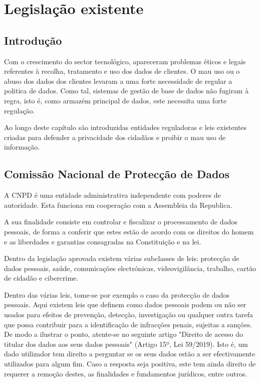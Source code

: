 \chapter{Legislação existente}
\label{chap4:legislacao}

\section{Introdução}
\label{chap4:intro}

Com o crescimento do sector tecnológico, apareceram problemas éticos e legais referentes à recolha, tratamento e uso dos dados de clientes. O mau uso ou o abuso dos dados dos clientes levaram a uma forte necessidade de regular a politica de dados. Como tal, sistemas de gestão de base de dados não fugiram à regra, isto é, como armazém principal de dados, este necessita uma forte regulação.

Ao longo deste capítulo são introduzidas entidades reguladoras e leis existentes criadas para defender a privacidade dos cidadãos e proibir o mau uso de informação.

\section{Comissão Nacional de Protecção de Dados}
\label{chap4:CNPD}

A \ac{CNPD} é uma entidade administrativa independente com poderes de autoridade. Esta funciona em cooperação com a Assembleia da Republica.

A sua finalidade consiste em controlar e fiscalizar o processamento de dados pessoais, de forma a conferir que estes estão de acordo com os direitos do homem e as liberdades e garantias consagradas na Constituição e na lei.

Dentro da legislação aprovada existem várias subclasses de leis: protecção de dados pessoais, saúde, comunicações electrónicas, videovigilância, trabalho, cartão de cidadão e cibercrime.

Dentro das várias leis, tome-se por exemplo o caso da protecção de dados pessoais. Aqui existem leis que definem como dados pessoais podem ou não ser usados para efeitos de prevenção, detecção, investigação ou qualquer outra tarefa que possa contribuir para a identificação de infracções penais, sujeitas a sanções. De modo a ilustrar o ponto, atente-se no seguinte artigo "Direito de acesso do titular dos dados aos seus dados pessoais" (Artigo 15º, Lei 59/2019). Isto é, um dado utilizador tem direito a perguntar se os seus dados estão a ser efectivamente utilizados para algum fim. Caso a resposta seja positiva, este tem ainda direito de requerer a remoção destes, as finalidades e fundamentos jurídicos, entre outros.

